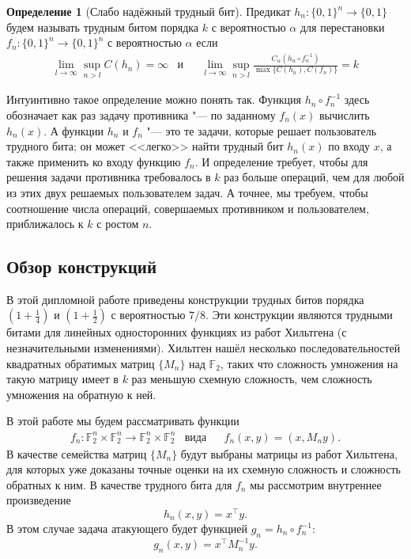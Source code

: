 \documentclass[oneside, a4paper]{article}
\theoremstyle{definition}
\newtheorem{definition}{Определение}
\theoremstyle{remark}
\newcommand\F{\ensuremath{\mathbb F}}
\begin{document}
\begin{definition}[Слабо надёжный трудный бит]
Предикат $h_n : \{0, 1\}^n \to \{0, 1\}$ будем называть трудным битом порядка
$k$ с вероятностью $\alpha$ для перестановки $f_n : \{0, 1\}^n \to \{0, 1\}^n$ с
вероятностью $\alpha$ если
\[
\begin{aligned}
&\lim_{l \to \infty} \sup_{n > l} C(h_n) = \infty
&
\text{и}&
&
\lim_{l \to \infty} \sup_{n > l} \frac {C_\alpha(h_n \circ f_n^{-1})} {\max \{ C(h_n), C(f_n) \}} = k&
\end{aligned}
\]
\end{definition}

Интуинтивно такое определение можно понять так. Функция $h_n \circ f_n^{-1}$
здесь обозначает как раз задачу противника "--- по заданному $f_n(x)$ вычислить
$h_n(x)$. А функции $h_n$ и $f_n$ "--- это те задачи, которые решает
пользователь трудного бита; он может <<легко>> найти трудный бит $h_n(x)$ по
входу $x$, а также применить ко входу функцию $f_n$. И определение требует,
чтобы для решения задачи противника требовалось в $k$ раз больше операций, чем
для любой из этих двух решаемых пользователем задач. А точнее, мы требуем, чтобы
соотношение числа операций, совершаемых противником и пользователем,
приближалось к $k$ с ростом $n$.

\subsection{Обзор конструкций}

В этой дипломной работе приведены конструкции трудных битов порядка $(1
+ \frac 1 4)$ и $(1 + \frac 1 2)$ с вероятностью $7/8$. Эти конструкции
являются трудными битами для линейных односторонних функциях из работ Хильтгена
\cite{hiltgen_article} (с незначительными изменениями). Хильтген нашёл несколько
последовательностей квадратных обратимых матриц $\{M_n\}$ над $\F_2$, таких что
сложность умножения на такую матрицу имеет в $k$ раз меньшую схемную сложность,
чем сложность умножения на обратную к ней.

В этой работе мы будем рассматривать функции
\[
\begin{aligned}
&f_n : \F_2^n \times \F_2^n \to \F_2^n \times \F_2^n
&
\text{вида}&
&
f_n(x, y) = (x, M_n y).&
\end{aligned}
\]
В качестве семейства матриц
$\{M_n\}$ будут выбраны матрицы из работ Хильтгена, для которых уже доказаны
точные оценки на их схемную сложность и сложность обратных к ним. В качестве
трудного бита для $f_n$ мы рассмотрим внутреннее произведение \[
h_n(x, y) = x^\top y.
\]
В этом случае задача атакующего будет функцией $g_n = h_n \circ f_n^{-1}$:
\[
g_n(x, y) = x^\top M_n^{-1} y.
\]
\end{document}

